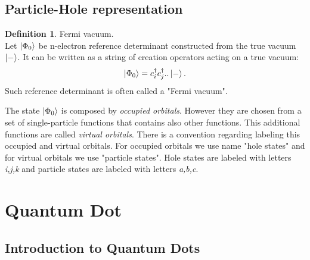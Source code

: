 \documentclass[twoside,english]{uiofysmaster}
\theoremstyle{definition}
\newtheorem{defn}{Definition}
\begin{document}



\section{Particle-Hole representation}

\begin{defn}Fermi vacuum.\\
	Let $\ket{\Phi_0}$ be n-electron reference determinant constructed from the true vacuum $\ket{-}$. It can be written as a string of creation operators acting on a true vacuum:
	\[ \ket{\Phi_0} = c^\dagger_i c^\dagger_j ..\ket{-}. \]
	Such reference determinant is often called a "Fermi vacuum".
\end{defn}
The state $\ket{\Phi_0}$ is composed by \textit{occupied orbitals}. However they are chosen from a set of single-particle functions that contains also other functions. This additional functions are called \textit{virtual orbitals}. There is a convention regarding labeling this occupied and virtual orbitals. For occupied orbitals we use name "hole states" and for virtual orbitals we use "particle states". Hole states are labeled with letters \textit{i,j,k} and particle states are labeled with letters \textit{a,b,c}.\\

\chapter{Quantum Dot}

\section{Introduction to Quantum Dots}
\end{document}
